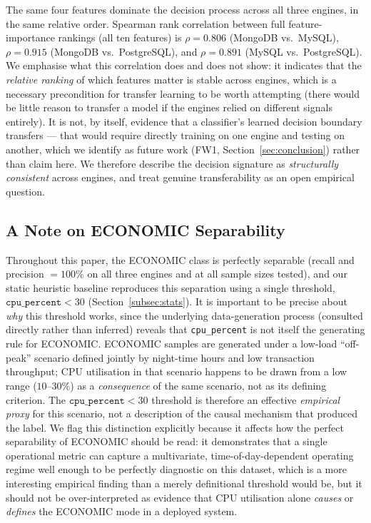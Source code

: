 \documentclass[pdflatex,sn-mathphys-num]{sn-jnl}
\theoremstyle{thmstyleone}
\theoremstyle{thmstylethree}
\begin{document}
The same four features dominate the decision process across all three
engines, in the same relative order. Spearman rank correlation between
full feature-importance rankings (all ten features) is $\rho = 0.806$
(MongoDB vs.\ MySQL), $\rho = 0.915$ (MongoDB vs.\ PostgreSQL), and
$\rho = 0.891$ (MySQL vs.\ PostgreSQL). We emphasise what this
correlation does and
does not show: it indicates that the \emph{relative ranking} of which
features matter is stable across engines, which is a necessary
precondition for transfer learning to be worth attempting (there
would be little reason to transfer a model if the engines relied on
different signals entirely). It is not, by itself, evidence that a
classifier's learned decision boundary transfers --- that would
require directly training on one engine and testing on another, which
we identify as future work (FW1, Section~\ref{sec:conclusion}) rather
than claim here. We therefore describe the decision signature as
\emph{structurally consistent} across engines, and treat genuine
transferability as an open empirical question.

\subsection{A Note on ECONOMIC Separability}\label{subsec:economic-note}

Throughout this paper, the ECONOMIC class is perfectly separable
(recall and precision $=100\%$ on all three engines and at all sample
sizes tested), and our static heuristic baseline reproduces this
separation using a single threshold, $\texttt{cpu\_percent} < 30$
(Section~\ref{subsec:stats}). It is important to be precise about
\emph{why} this threshold works, since the underlying data-generation
process (consulted directly rather than inferred) reveals that
\texttt{cpu\_percent} is not itself the generating rule for ECONOMIC.
ECONOMIC samples are generated under a low-load
``off-peak'' scenario defined jointly by night-time hours and low
transaction throughput; CPU utilisation in that scenario happens to be
drawn from a low range ($10$--$30\%$) as a \emph{consequence} of the
same scenario, not as its defining criterion. The
$\texttt{cpu\_percent}<30$ threshold is therefore an effective
\emph{empirical proxy} for this scenario, not a description of the
causal mechanism that produced the label. We flag this distinction
explicitly because it affects how the perfect separability of
ECONOMIC should be read: it demonstrates that a single operational
metric can capture a multivariate, time-of-day-dependent operating
regime well enough to be perfectly diagnostic on this dataset, which
is a more interesting empirical finding than a merely definitional
threshold would be, but it should not be over-interpreted as evidence
that CPU utilisation alone \emph{causes} or \emph{defines} the
ECONOMIC mode in a deployed system.
\end{document}
